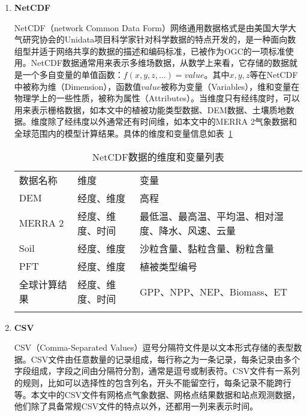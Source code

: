 \begin{enumerate}[(1)]
    \item \textbf{NetCDF}
    
    NetCDF（network Common Data Form）网络通用数据格式是由美国大学大气研究协会的Unidata项目科学家针对科学数据的特点开发的，是一种面向数组型并适于网络共享的数据的描述和编码标准，已被作为OGC的一项标准使用。NetCDF数据通常用来表示多维场数据，从数学上来看，它存储的数据就是一个多自变量的单值函数：$f(x,y,z,...)=value$。其中$x,y,z$等在NetCDF中被称为维（Dimension），函数值$value$被称为变量（Variables），维和变量在物理学上的一些性质，被称为属性（Attributes）。当维度只有经纬度时，可以用来表示栅格数据，如本文中的植被功能类型数据、DEM数据、土壤质地数据。维度除了经纬度以外通常还有时间维，如本文中的MERRA 2气象数据和全球范围内的模型计算结果。具体的维度和变量信息如表~\ref{tab:nc-dim-var} %

    \begin{table}[H]
        \centering
        \caption{NetCDF数据的维度和变量列表}
        \label{tab:nc-dim-var}
        \begin{threeparttable}
            \begin{tabular}{lll}
                \Xhline{1.5pt}
                数据名称 & 维度 & 变量 \\
                \Xhline{1.5pt}
                DEM & 经度、维度 & 高程 \\
                \hline
                MERRA 2 & 经度、维度、时间 & \multicolumn{1}{m{0.4\columnwidth}}{最低温、最高温、平均温、相对湿度、降水、风速、云量} \\
                \hline
                Soil & 经度、维度 & \multicolumn{1}{m{0.4\columnwidth}}{沙粒含量、黏粒含量、粉粒含量} \\
                \hline
                PFT & 经度、维度 & 植被类型编号 \\
                \hline
                全球计算结果 & 经度、维度、时间 & \multicolumn{1}{m{0.4\columnwidth}}{GPP、NPP、NEP、Biomass、ET} \\
                \Xhline{1.5pt}
            \end{tabular}
        \end{threeparttable}
    \end{table}

    \item \textbf{CSV}
    
    CSV（Comma-Separated Values）逗号分隔符文件是以文本形式存储的表型数据。CSV文件由任意数量的记录组成，每行称之为一条记录，每条记录由多个字段组成，字段之间由分隔符分割，通常是逗号或制表符。CSV文件有一系列的规则，比如可以选择性的包含列名，开头不能留空行，每条记录不能跨行等。本文中的CSV文件有网格点气象数据、网格点结果数据和站点观测数据，他们除了具备常规CSV文件的特点以外，还都用一列来表示时间。


\end{enumerate}

